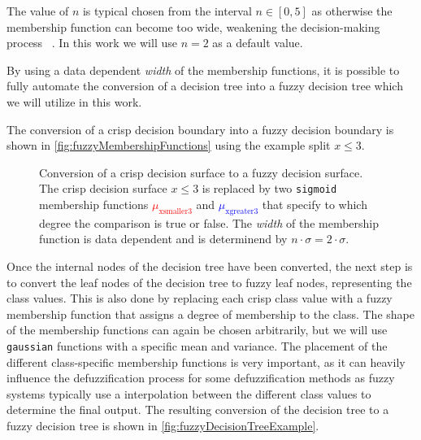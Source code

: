 The value of $n$ is typical chosen from the interval $n\in [0,5]$ as otherwise the membership function can become too wide, weakening the decision-making process ~\cite{CROCKETT20062809}. In this work we will use $n=2$ as a default value.

By using a data dependent \emph{width} of the membership functions, it is possible to fully automate the conversion of a decision tree into a fuzzy decision tree which we will utilize in this work.


The conversion of a crisp decision boundary into a fuzzy decision boundary is shown in \autoref{fig:fuzzyMembershipFunctions} using the example split $x \leq 3$.



\begin{figure}[h]
    \centering
    \caption[Conversion of crisp tree node into fuzzy tree node]{Conversion of a crisp decision surface to a fuzzy decision surface. The crisp decision surface $x \leq 3$ is replaced by two \texttt{sigmoid} membership functions \textcolor{red}{$\mu_{\text{xsmaller3}}$} and \textcolor{blue}{$\mu_{\text{xgreater3}}$} that specify to which degree the comparison is true or false. The \emph{width} of the membership function is data dependent and is determinend by $n\cdot \sigma = 2 \cdot \sigma$.}
    \label{fig:fuzzyMembershipFunctions}
\end{figure}


Once the internal nodes of the decision tree have been converted, the next step is to convert the leaf nodes of the decision tree to fuzzy leaf nodes, representing the class values. This is also done by replacing each crisp class value with a fuzzy membership function that assigns a degree of membership to the class. The shape of the membership functions can again be chosen arbitrarily, but we will use \texttt{gaussian} functions with a specific mean and variance. The placement of the different class-specific membership functions is very important, as it can heavily influence the defuzzification process for some defuzzification methods as fuzzy systems typically use a interpolation between the different class values to determine the final output. The resulting conversion of the decision tree to a fuzzy decision tree is shown in \autoref{fig:fuzzyDecisionTreeExample}.


